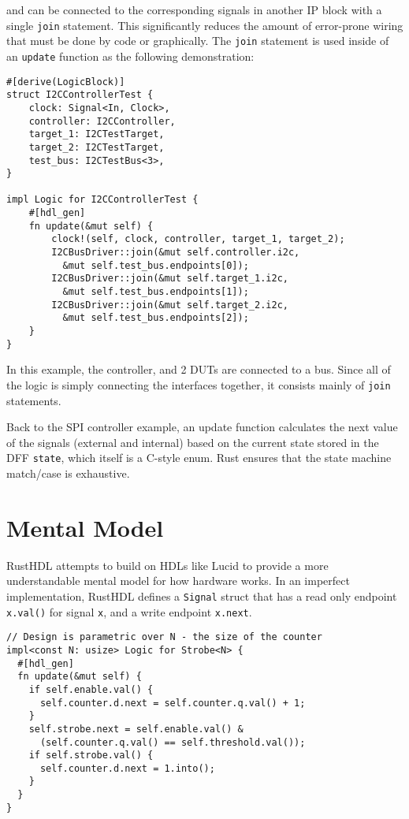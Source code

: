 \documentclass[sigplan,screen,sigconf]{acmart}
\begin{document}
and can be connected to the corresponding signals in another IP block with a single \verb|join|
statement.  This significantly reduces the amount of error-prone wiring that must be done
by code or graphically.  The \verb|join| statement is used inside of an \verb|update| function as the
following demonstration:

\begin{verbatim}
#[derive(LogicBlock)]
struct I2CControllerTest {
    clock: Signal<In, Clock>,
    controller: I2CController,
    target_1: I2CTestTarget,
    target_2: I2CTestTarget,
    test_bus: I2CTestBus<3>,
}

impl Logic for I2CControllerTest {
    #[hdl_gen]
    fn update(&mut self) {
        clock!(self, clock, controller, target_1, target_2);
        I2CBusDriver::join(&mut self.controller.i2c, 
          &mut self.test_bus.endpoints[0]);
        I2CBusDriver::join(&mut self.target_1.i2c,
          &mut self.test_bus.endpoints[1]);
        I2CBusDriver::join(&mut self.target_2.i2c, 
          &mut self.test_bus.endpoints[2]);
    }
}
\end{verbatim}

In this example, the controller, and 2 DUTs are connected to a bus.  Since all of the logic is simply
connecting the interfaces together, it consists mainly of \verb|join| statements. 

Back to the SPI controller example, an update function calculates the next value of the 
signals (external and internal) based on the current state stored in the DFF \verb|state|,
which itself is a C-style enum.  Rust ensures that the state machine match/case is exhaustive. 

\section{Mental Model}
RustHDL attempts to build on HDLs like Lucid\cite{b11} to provide a more understandable mental model for how 
hardware works.  In an imperfect implementation, RustHDL defines a \verb|Signal| struct that has a 
read only endpoint \verb|x.val()| for signal \verb|x|, and a write endpoint \verb|x.next|.  

\begin{verbatim}
// Design is parametric over N - the size of the counter
impl<const N: usize> Logic for Strobe<N> {
  #[hdl_gen]
  fn update(&mut self) {
    if self.enable.val() {
      self.counter.d.next = self.counter.q.val() + 1;
    }
    self.strobe.next = self.enable.val() & 
      (self.counter.q.val() == self.threshold.val());
    if self.strobe.val() {
      self.counter.d.next = 1.into();
    }
  }
} 
\end{verbatim}
\end{document}
